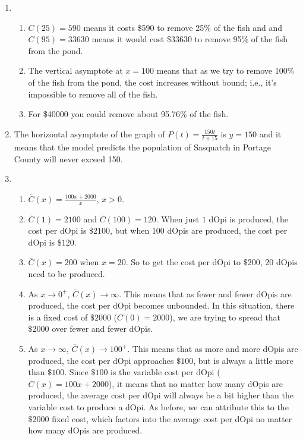 \begin{enumerate}
\setcounter{enumi}{\value{HW}}

\item \begin{enumerate}

\item $C(25) = 590$ means it costs \$590 to remove 25\% of the fish and and $C(95)= 33630$ means it would cost \$33630 to remove 95\% of the fish from the pond.
\item The vertical asymptote at $x = 100$ means that as we try to remove 100\% of the fish from the pond, the cost increases without bound; i.e., it's impossible to remove all of the fish.  
\item For \$40000 you could remove about 95.76\% of the fish.

\end{enumerate}


\item The horizontal asymptote of the graph of $P(t) = \frac{150t}{t + 15}$ is $y = 150$ and it means that the model predicts the population of Sasquatch in Portage County will never exceed 150.

\item  \begin{enumerate}

\item $\overline{C}(x) = \frac{100x+2000}{x}$, $x > 0$.

\item  $\overline{C}(1) = 2100$ and $\overline{C}(100) = 120$. When just $1$ dOpi is produced, the cost per dOpi is $\$2100$, but when $100$ dOpis are produced, the cost per dOpi is $\$120$.  

\item  $\overline{C}(x) = 200$ when $x = 20$.  So to get the cost per dOpi to $\$200$, $20$ dOpis need to be produced.

\item  As $x \rightarrow 0^{+}$, $\overline{C}(x) \rightarrow \infty$.  This means that as fewer and fewer dOpis are produced, the cost per dOpi becomes unbounded.  In this situation, there is a fixed cost of $\$2000$ ($C(0) = 2000$), we are trying to spread that $\$2000$ over fewer and fewer dOpis.

\item   As $x \rightarrow \infty$,  $\overline{C}(x) \rightarrow 100^{+}$.  This means that as more and more dOpis are produced, the cost per dOpi approaches $\$100$, but is always a little more than $\$100$.  Since $\$100$ is the variable cost per dOpi ($C(x) = \underline{100}x+2000$), it means that no matter how many dOpis are produced, the average cost per dOpi will always be a bit higher than the variable cost to produce a dOpi.  As before, we can attribute this to the $\$2000$ fixed cost, which factors into the average cost per dOpi no matter how many dOpis are produced.



\end{enumerate}
\end{enumerate}
